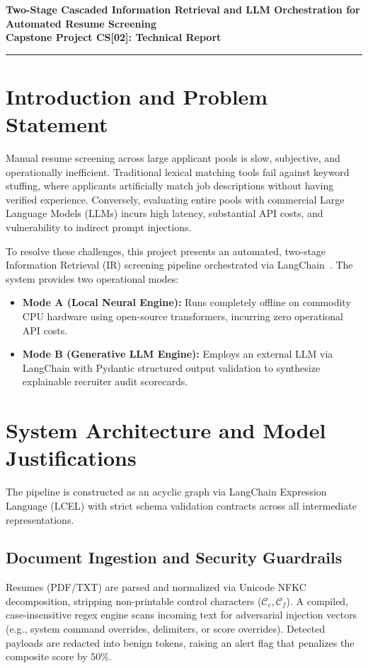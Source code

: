 \documentclass[12pt,a4paper]{article}
\begin{document}
\begin{center}
    {\fontsize{14}{16}\bfseries Two-Stage Cascaded Information Retrieval and LLM Orchestration for Automated Resume Screening}\\[2.5pt]
    {\fontsize{10.5}{12.5}\bfseries Capstone Project CS[02]: Technical Report}\\[1.5pt]
    \rule{\textwidth}{0.6pt}
\end{center}

\vspace{-16pt}

\section{Introduction and Problem Statement}
Manual resume screening across large applicant pools is slow, subjective, and operationally inefficient. Traditional lexical matching tools fail against keyword stuffing, where applicants artificially match job descriptions without having verified experience. Conversely, evaluating entire pools with commercial Large Language Models (LLMs) incurs high latency, substantial API costs, and vulnerability to indirect prompt injections.

To resolve these challenges, this project presents an automated, two-stage Information Retrieval (IR) screening pipeline orchestrated via LangChain~\cite{langchain}. The system provides two operational modes:
\begin{itemize}[topsep=1pt,itemsep=0pt,parsep=0pt]
    \item \textbf{Mode A (Local Neural Engine):} Runs completely offline on commodity CPU hardware using open-source transformers, incurring zero operational API costs.
    \item \textbf{Mode B (Generative LLM Engine):} Employs an external LLM via LangChain with Pydantic structured output validation to synthesize explainable recruiter audit scorecards.
\end{itemize}

\section{System Architecture and Model Justifications}
The pipeline is constructed as an acyclic graph via LangChain Expression Language (LCEL) with strict schema validation contracts across all intermediate representations.

\subsection{Document Ingestion and Security Guardrails}
Resumes (PDF/TXT) are parsed and normalized via Unicode NFKC decomposition, stripping non-printable control characters ($\mathcal{C}_c, \mathcal{C}_f$). A compiled, case-insensitive regex engine scans incoming text for adversarial injection vectors (e.g., system command overrides, delimiters, or score overrides). Detected payloads are redacted into benign tokens, raising an alert flag that penalizes the composite score by 50\%.
\end{document}
